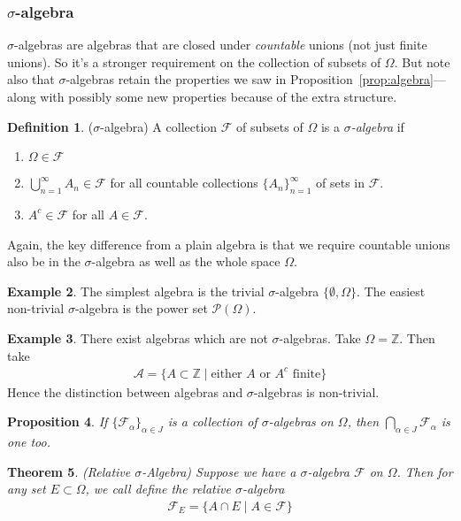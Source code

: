 \documentclass[12pt]{article}
\theoremstyle{plain}
\newtheorem{thm}{Theorem}[section]
\newtheorem{prop}[thm]{Proposition}
\theoremstyle{definition}
\newtheorem{defn}[thm]{Definition}
\newtheorem{ex}[thm]{Example}
\theoremstyle{remark}
\newcommand{\sF}{\mathscr{F}}
\begin{document}
\subsubsection{$\sigma$-algebra}

$\sigma$-algebras are algebras that are closed under \emph{countable}
unions (not just finite unions). So it's a stronger requirement on the
collection of subsets of $\Omega$. But note also that $\sigma$-algebras
retain the properties we saw in Proposition~\ref{prop:algebra}---along
with possibly some new properties because of the extra structure.

\begin{defn}($\sigma$-algebra)
A collection $\sF$ of subsets of $\Omega$ is a \emph{$\sigma$-algebra}
if
\begin{enumerate}
  \item $\Omega\in\sF$
  \item $\bigcup_{n=1}^\infty A_n \in \sF$ for all countable
    collections $\{A_n\}_{n=1}^\infty$ of sets in $\sF$.
  \item $A^c \in \sF$ for all $A\in\sF$.
\end{enumerate}
Again, the key difference from a plain algebra is that we require
countable unions also be in the $\sigma$-algebra as well as the whole
space $\Omega$.
\end{defn}

\begin{ex}
The simplest algebra is the trivial $\sigma$-algebra $\{\emptyset, \Omega\}$.
The easiest non-trivial $\sigma$-algebra is the power set
$\mathscr{P}(\Omega)$.
\end{ex}

\begin{ex}
There exist algebras which are not $\sigma$-algebras. Take
$\Omega=\mathbb{Z}$. Then take
\begin{align*}
  \mathscr{A}
  = \{A\subset \mathbb{Z} \; |\; \text{either $A$ or $A^c$ finite}\}
\end{align*}
Hence the distinction between algebras and $\sigma$-algebras is
non-trivial.
\end{ex}

\begin{prop}
\label{prop:sigma-intersection}
If $\{\sF_\alpha\}_{\alpha\in J}$ is a collection of
$\sigma$-algebras on $\Omega$, then $\bigcap_{\alpha\in J} \sF_\alpha$
is one too.
\end{prop}


\begin{thm}\emph{(Relative $\sigma$-Algebra)}
\label{thm:relsigal}
Suppose we have a $\sigma$-algebra $\sF$ on $\Omega$. Then for any set
$E\subset \Omega$, we call define the
\emph{relative $\sigma$-algebra}
\begin{align*}
  \sF_E = \{ A \cap E \; | \; A \in \sF\}
\end{align*}
\end{thm}
\end{document}
